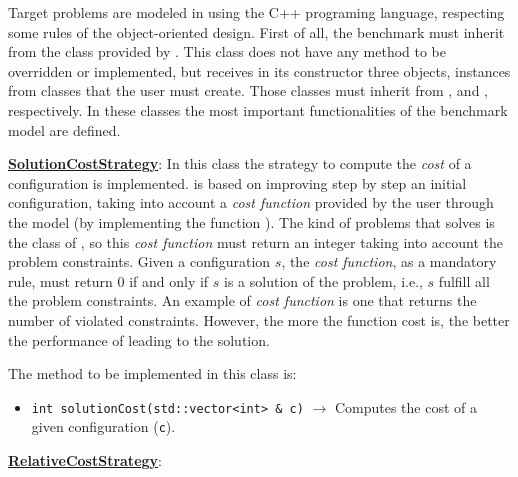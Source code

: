 
Target problems are modeled in \posl{} using the C++ programing language, respecting some rules of the object-oriented design. First of all, the benchmark must inherit from the class  provided by \posl. This class does not have any method to be overridden or implemented, but receives in its constructor three objects, instances from classes that the user must create. Those classes must inherit from ,  and , respectively. In these classes the most important functionalities of the benchmark model are defined.

\underline{\textbf{SolutionCostStrategy}}: In this class the strategy to compute the \textit{cost} of a configuration is implemented. \posl{} is based on improving step by step an initial configuration, taking into account a \textit{cost function} provided by the user through the model (by implementing the function ). The kind of problems that \posl{} solves is the class of \CSPs{}, so this \textit{cost function} must return an integer taking into account the problem constraints. Given a configuration $s$, the \textit{cost function}, as a mandatory rule, must return 0 if and only if $s$ is a solution of the problem, i.e., $s$ fulfill all the problem constraints. An example of \textit{cost function} is one that returns the number of violated constraints. However, the more  the function cost is, the better the performance of \posl{} leading to the solution.

The method to be implemented in this class is:

\begin{itemize}
\item \verb|int solutionCost(std::vector<int> & c)| $\rightarrow$ Computes the cost of a given configuration (\verb|c|).
\end{itemize}

\underline{\textbf{RelativeCostStrategy}}: 

